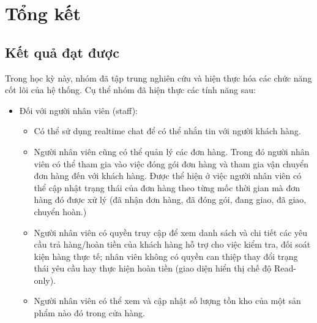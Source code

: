 \section{Tổng kết}

\subsection{Kết quả đạt được}

Trong học kỳ này, nhóm đã tập trung nghiên cứu và hiện thực hóa các chức năng cốt lõi của hệ thống. Cụ thể nhóm đã hiện thực các tính năng sau:

\begin{itemize}
	\item Đối với người nhân viên (staff):
	      \begin{itemize}
		      \item Có thể sử dụng realtime chat để có thể nhắn tin với người khách hàng.
		      \item Người nhân viên cũng có thể quản lý các đơn hàng. Trong đó người nhân viên có thể tham gia vào việc đóng gói đơn hàng và tham gia vận chuyển đơn hàng đến với khách hàng. Được thể hiện ở việc người nhân viên có thể cập nhật trạng thái của đơn hàng theo từng mốc thời gian mà đơn hàng đó được xử lý (đã nhận đơn hàng, đã đóng gói, đang giao, đã giao, chuyển hoàn.)
		      \item Người nhân viên có quyền truy cập để xem danh sách và chi tiết các yêu cầu trả hàng/hoàn tiền của khách hàng hỗ trợ cho việc kiểm tra, đối soát kiện hàng thực tế; nhân viên không có quyền can thiệp thay đổi trạng thái yêu cầu hay thực hiện hoàn tiền (giao diện hiển thị chế độ Read-only).
		      \item Người nhân viên có thể xem và cập nhật số lượng tồn kho của một sản phẩm nào đó trong cửa hàng.
	      \end{itemize}


\end{itemize}
